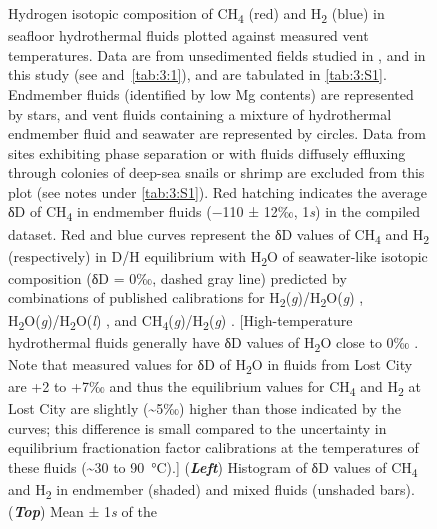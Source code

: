 {\begin{landscape}
		\begin{figure}[h!]
			\caption[Data and models of D/H of CH\textsubscript{4} and H\textsubscript{2} in seafloor hydrothermal fluids]{%
			Hydrogen
			isotopic composition of CH\textsubscript{4} (red) and H\textsubscript{2}
			(blue) in seafloor hydrothermal fluids plotted against measured vent
			temperatures. Data are from unsedimented fields studied in \textcite{Welhan+Craig_1983,Proskurowski++_2006_CG,Kawagucci++_2010_JGR,Charlou++_2010}, and in this study (see  and~\ref{tab:3:1}), and are tabulated in
			\autoref{tab:3:S1}. Endmember fluids (identified by low Mg contents)
			are represented by stars, and vent fluids containing a mixture of
			hydrothermal endmember fluid and seawater are represented by circles.
			Data from sites exhibiting phase separation \parencite{Charlou++_2010} or
			with fluids diffusely effluxing through colonies of deep-sea snails or
			shrimp \parencite{Kawagucci++_2010_JGR} are excluded from this plot (see notes
			under \autoref{tab:3:S1}). Red hatching indicates the average δD of
			CH\textsubscript{4} in endmember fluids ($-$110 ± 12‰, 1\emph{s}) in the
			compiled dataset. Red and blue curves represent the δD values of
			CH\textsubscript{4} and H\textsubscript{2} (respectively) in D/H
			equilibrium with H\textsubscript{2}O of seawater-like isotopic
			composition (δD = 0‰, dashed gray line) predicted by combinations of
			published calibrations for
			H\textsubscript{2}(\emph{g})/H\textsubscript{2}O(\emph{g}) \parencite{Suess_1949,Cerrai++_1954,Bardo+Wolfsberg_1976_JPC},
			H\textsubscript{2}O(\emph{g})/H\textsubscript{2}O(\emph{l}) \parencite{Horita+Wesolowski_1994_GCA}, and
			CH\textsubscript{4}(\emph{g})/H\textsubscript{2}(\emph{g}) \parencite{Horibe+Craig_1995_GCA}. {[}High-temperature hydrothermal fluids generally have δD
			values of H\textsubscript{2}O close to 0‰ \parencite{Shanks++_1995_AGU-GM}. Note
			that measured values for δD of H\textsubscript{2}O in fluids from Lost
			City are +2 to +7‰ \parencite{Proskurowski++_2006_CG} and thus the equilibrium
			values for CH\textsubscript{4} and H\textsubscript{2} at Lost City are
			slightly (\textasciitilde{}5‰) higher than those indicated by the
			curves; this difference is small compared to the uncertainty in
			equilibrium fractionation factor calibrations at the temperatures of
			these fluids (\textasciitilde{}30 to 90~°C).{]} (\emph{\textbf{Left}})
			Histogram of δD values of CH\textsubscript{4} and H\textsubscript{2} in
			endmember (shaded) and mixed fluids (unshaded bars).
			(\emph{\textbf{Top}}) Mean ± 1\emph{s} of the
}
\end{figure}
\end{landscape}}
